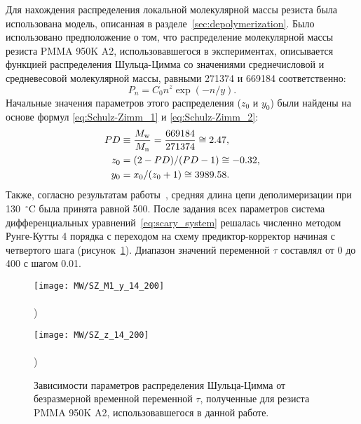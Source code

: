 Для нахождения распределения локальной молекулярной массы резиста была использована модель, описанная в разделе~\ref{sec:depolymerization}. Было использовано предположение о том, что распределение молекулярной массы резиста PMMA 950K A2, использовавшегося в экспериментах, описывается функцией распределения Шульца-Цимма со значениями среднечисловой и средневесовой молекулярной массы, равными 271374 и 669184 соответственно:
\begin{equation} \label{eq:Schulz-Zimm_distribution}
	P_n = C_0 n^z \exp (-n/y).
\end{equation}
Начальные значения параметров этого распределения ($z_0$ и $y_0$) были найдены на основе формул \ref{eq:Schulz-Zimm_1} и \ref{eq:Schulz-Zimm_2}:
\begin{equation}
	\begin{aligned}
		PD & \equiv \frac{M_\mathrm{w}}{M_\mathrm{n}} = \frac{669184}{271374} \cong 2.47, \\
		z_0 & = (2-PD)/(PD-1) \cong -0.32, \\
		y_0 & = x_0/(z_0+1) \cong 3989.58.
	\end{aligned}
\end{equation}
Также, согласно результатам работы~\cite{Mita_PMMA_zip_lengths_T}, средняя длина цепи деполимеризации при 130~$^\circ$C была принята равной 500. После задания всех параметров система дифференциальных уравнений~\ref{eq:scary_system} решалась численно методом Рунге-Кутты 4 порядка с переходом на схему предиктор-корректор начиная с четвертого шага (рисунок~\ref{fig:SZ_M1_y_tau}). Диапазон значений переменной $\tau$ составлял от 0 до 400 с шагом 0.01.

\begin{figure}[t]
	\begin{minipage}{0.48\textwidth}
			\hspace{-0.5em} \texttt{[image: MW/SZ\_M1\_y\_14\_200]} \\
			\vspace{-12.5ex} \\ ) \\ \vspace{12.5ex}
		\end{minipage}
	\begin{minipage}{0.48\textwidth}
			\texttt{[image: MW/SZ\_z\_14\_200]} \\
			\vspace{-12.5ex} \\ ) \\ \vspace{12.5ex}
		\end{minipage}
	\vspace{-3.5em}
	\caption{Зависимости параметров распределения Шульца-Цимма от безразмерной временной переменной $\tau$, полученные для резиста PMMA 950K A2, использовавшегося в данной работе.}
	\label{fig:SZ_M1_y_tau}
\end{figure}

